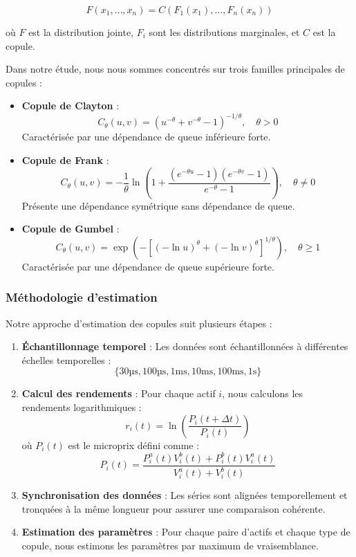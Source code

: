 \documentclass[12pt,a4paper]{article}
\theoremstyle{definition}
\theoremstyle{remark}
\begin{document}
\begin{equation}
F(x_1, \ldots, x_n) = C(F_1(x_1), \ldots, F_n(x_n))
\end{equation}

où $F$ est la distribution jointe, $F_i$ sont les distributions marginales, et $C$ est la copule.

Dans notre étude, nous nous sommes concentrés sur trois familles principales de copules :

\begin{itemize}
    \item \textbf{Copule de Clayton} :
    \[C_\theta(u,v) = (u^{-\theta} + v^{-\theta} - 1)^{-1/\theta}, \quad \theta > 0\]
    Caractérisée par une dépendance de queue inférieure forte.
    
    \item \textbf{Copule de Frank} :
    \[C_\theta(u,v) = -\frac{1}{\theta}\ln\left(1 + \frac{(e^{-\theta u}-1)(e^{-\theta v}-1)}{e^{-\theta}-1}\right), \quad \theta \neq 0\]
    Présente une dépendance symétrique sans dépendance de queue.
    
    \item \textbf{Copule de Gumbel} :
    \[C_\theta(u,v) = \exp\left(-\left[(-\ln u)^\theta + (-\ln v)^\theta\right]^{1/\theta}\right), \quad \theta \geq 1\]
    Caractérisée par une dépendance de queue supérieure forte.
\end{itemize}

\subsubsection{Méthodologie d'estimation}

Notre approche d'estimation des copules suit plusieurs étapes :

\begin{enumerate}
    \item \textbf{Échantillonnage temporel} : Les données sont échantillonnées à différentes échelles temporelles :
    \[\{\text{30µs}, \text{100µs}, \text{1ms}, \text{10ms}, \text{100ms}, \text{1s}\}\]
    
    \item \textbf{Calcul des rendements} : Pour chaque actif $i$, nous calculons les rendements logarithmiques :
    \[r_i(t) = \ln\left(\frac{P_i(t+\Delta t)}{P_i(t)}\right)\]
    où $P_i(t)$ est le microprix défini comme :
    \[P_i(t) = \frac{P^a_i(t)V^b_i(t) + P^b_i(t)V^a_i(t)}{V^a_i(t) + V^b_i(t)}\]
    
    \item \textbf{Synchronisation des données} : Les séries sont alignées temporellement et tronquées à la même longueur pour assurer une comparaison cohérente.
    
    \item \textbf{Estimation des paramètres} : Pour chaque paire d'actifs et chaque type de copule, nous estimons les paramètres par maximum de vraisemblance.
\end{enumerate}
\end{document}
